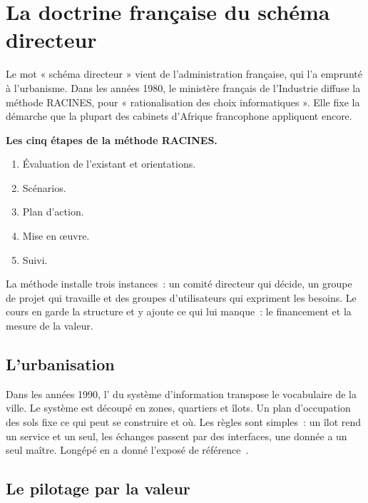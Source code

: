 \section{La doctrine française du schéma directeur}
\label{sec:c05-france}

Le mot « schéma directeur » vient de l'administration française, qui l'a emprunté à l'urbanisme. Dans les
années 1980, le ministère français de l'Industrie diffuse la méthode RACINES, pour « rationalisation des choix
informatiques ». Elle fixe la démarche que la plupart des cabinets d'Afrique francophone appliquent encore.

\begin{boxprocedure}
\textbf{Les cinq étapes de la méthode RACINES.}
\begin{enumerate}
    \item Évaluation de l'existant et orientations.
    \item Scénarios.
    \item Plan d'action.
    \item Mise en œuvre.
    \item Suivi.
\end{enumerate}
\end{boxprocedure}

La méthode installe trois instances~: un comité directeur qui décide, un groupe de projet qui travaille et des
groupes d'utilisateurs qui expriment les besoins. Le cours en garde la structure et y ajoute ce qui lui
manque~: le financement et la mesure de la valeur.

\subsection{L'urbanisation}

Dans les années 1990, l' du système d'information transpose le vocabulaire de la ville.
Le système est découpé en zones, quartiers et îlots. Un plan d'occupation des sols fixe ce qui peut se
construire et où. Les règles sont simples~: un îlot rend un service et un seul, les échanges passent par des
interfaces, une donnée a un seul maître. Longépé en a donné l'exposé de référence~\cite{longepe2001}.

\subsection{Le pilotage par la valeur}

